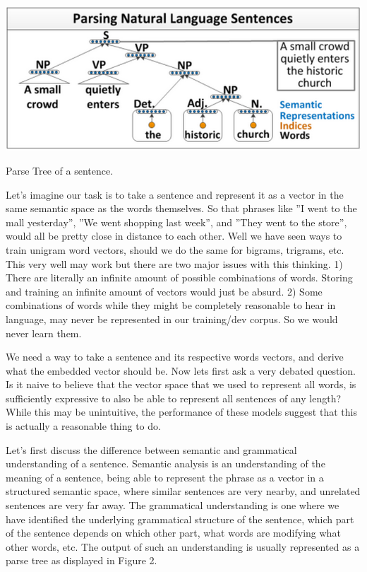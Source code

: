 \documentclass{tufte-handout}
\begin{document}
\begin{marginfigure}%
  \includegraphics[width=\linewidth]{img2}
  \caption{Parse Tree of a sentence. }
  \label{fig:img2}
\end{marginfigure}

Let's imagine our task is to take a sentence and represent it as a vector in the same semantic space as the words themselves. So that phrases like ''I went to the mall yesterday'', ''We went shopping last week'', and ''They went to the store'', would all be pretty close in distance to each other. Well we have seen ways to train unigram word vectors, should we do the same for bigrams, trigrams, etc. This very well may work but there are two major issues with this thinking. 1) There are literally an infinite amount of possible combinations of words. Storing and training an infinite amount of vectors would just be absurd. 2) Some combinations of words while they might be completely reasonable to hear in language, may never be represented in our training/dev corpus. So we would never learn them.

We need a way to take a sentence and its respective words vectors, and derive what the embedded vector should be. Now lets first ask a very debated question. Is it naive to believe that the vector space that we used to represent all words, is sufficiently expressive to also be able to represent all sentences of any length? While this may be unintuitive, the performance of these models suggest that this is actually a reasonable thing to do.

Let's first discuss the difference between semantic and grammatical understanding of a sentence. Semantic analysis is an understanding of the meaning of a sentence, being able to represent the phrase as a vector in a structured semantic space, where similar sentences are very nearby, and unrelated sentences are very far away. The grammatical understanding is one where we have identified the underlying grammatical structure of the sentence, which part of the sentence depends on which other part, what words are modifying what other words, etc. The output of such an understanding is usually represented as a parse tree as displayed in Figure 2. 
\end{document}
